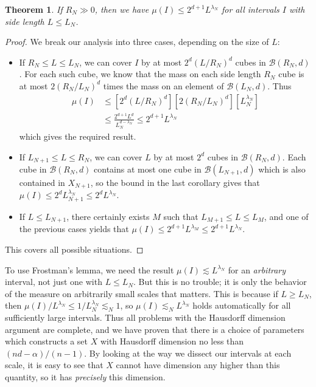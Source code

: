 \documentclass{article}
\theoremstyle{plain}
\theoremstyle{plain}
\newtheorem{theorem}{Theorem}
\begin{document}
\begin{multicols}{2}
\begin{theorem}
	If $R_N \gg 0$, then we have $\mu(I) \leq 2^{d+1} L^{\lambda_N}$ for all intervals $I$ with side length $L \leq L_N$.
\end{theorem}
\begin{proof}
	We break our analysis into three cases, depending on the size of $L$:
	\begin{itemize}
		\item If $R_N \leq L \leq L_N$, we can cover $I$ by at most $2^d(L/R_N)^d$ cubes in $\mathcal{B}(R_N,d)$. For each such cube, we know that the mass on each side length $R_N$ cube is at most $2(R_N/L_N)^d$ times the mass on an element of $\mathcal{B}(L_N,d)$. Thus
		\begin{align*}
			\mu(I) &\leq [2^d(L/R_N)^d] [2(R_N/L_N)^d] [L_N^{\lambda_N}]\\
			&\leq \frac{2^{d+1} L^d}{L_N^{d - \lambda_N}} \leq 2^{d+1} L^{\lambda_N}
		\end{align*}
		which gives the required result.

		\item If $L_{N+1} \leq L \leq R_N$, we can cover $L$ by at most $2^d$ cubes in $\mathcal{B}(R_N,d)$. Each cube in $\mathcal{B}(R_N,d)$ contains at most one cube in $\mathcal{B}(L_{N+1},d)$ which is also contained in $X_{N+1}$, so the bound in the last corollary gives that $\mu(I) \leq 2^d L_{N+1}^{\lambda_N} \leq 2^d L^{\lambda_N}$.

		\item If $L \leq L_{N+1}$, there certainly exists $M$ such that $L_{M+1} \leq L \leq L_M$, and one of the previous cases yields that $\mu(I) \leq 2^{d+1} L^{\lambda_M} \leq 2^{d+1} L^{\lambda_N}$.
	\end{itemize}
	This covers all possible situations.
\end{proof}

To use Frostman's lemma, we need the result $\mu(I) \lesssim L^{\lambda_N}$ for an {\it arbitrary} interval, not just one with $L \leq L_N$. But this is no trouble; it is only the behavior of the measure on arbitrarily small scales that matters. This is because if $L \geq L_N$, then $\mu(I)/L^{\lambda_N} \leq 1/L_N^{\lambda_N} \lesssim_N 1$, so $\mu(I) \lesssim_N L^{\lambda_N}$ holds automatically for all sufficiently large intervals. Thus all problems with the Hausdorff dimension argument are complete, and we have proven that there is a choice of parameters which constructs a set $X$ with Hausdorff dimension no less than $(nd - \alpha)/(n-1)$. By looking at the way we dissect our intervals at each scale, it is easy to see that $X$ cannot have dimension any higher than this quantity, so it has {\it precisely} this dimension.


\end{multicols}
\end{document}
